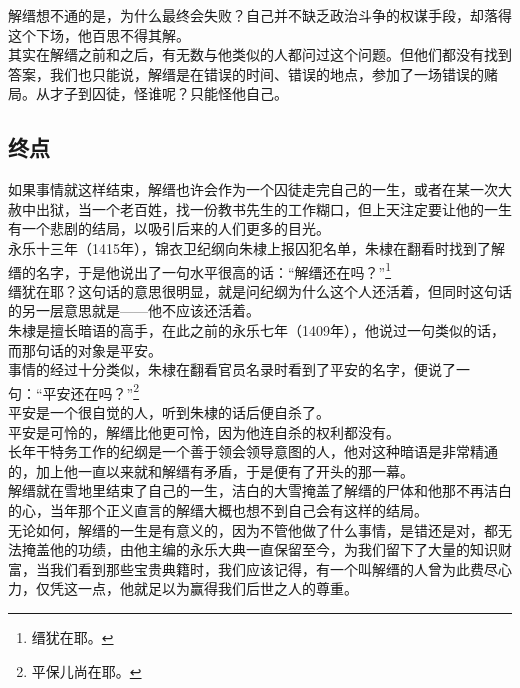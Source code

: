 \begin{multicols}{\theparacolNo}
解缙想不通的是，为什么最终会失败？自己并不缺乏政治斗争的权谋手段，却落得这个下场，他百思不得其解。\\

其实在解缙之前和之后，有无数与他类似的人都问过这个问题。但他们都没有找到答案，我们也只能说，解缙是在错误的时间、错误的地点，参加了一场错误的赌局。从才子到囚徒，怪谁呢？只能怪他自己。\\

\subsection{终点}
如果事情就这样结束，解缙也许会作为一个囚徒走完自己的一生，或者在某一次大赦中出狱，当一个老百姓，找一份教书先生的工作糊口，但上天注定要让他的一生有一个悲剧的结局，以吸引后来的人们更多的目光。\\

永乐十三年（1415年），锦衣卫纪纲向朱棣上报囚犯名单，朱棣在翻看时找到了解缙的名字，于是他说出了一句水平很高的话：“解缙还在吗？”\footnote{缙犹在耶。}\\

缙犹在耶？这句话的意思很明显，就是问纪纲为什么这个人还活着，但同时这句话的另一层意思就是——他不应该还活着。\\

朱棣是擅长暗语的高手，在此之前的永乐七年（1409年），他说过一句类似的话，而那句话的对象是平安。\\

事情的经过十分类似，朱棣在翻看官员名录时看到了平安的名字，便说了一句：“平安还在吗？”\footnote{平保儿尚在耶。}\\

平安是一个很自觉的人，听到朱棣的话后便自杀了。\\

平安是可怜的，解缙比他更可怜，因为他连自杀的权利都没有。\\

长年干特务工作的纪纲是一个善于领会领导意图的人，他对这种暗语是非常精通的，加上他一直以来就和解缙有矛盾，于是便有了开头的那一幕。\\

解缙就在雪地里结束了自己的一生，洁白的大雪掩盖了解缙的尸体和他那不再洁白的心，当年那个正义直言的解缙大概也想不到自己会有这样的结局。\\

无论如何，解缙的一生是有意义的，因为不管他做了什么事情，是错还是对，都无法掩盖他的功绩，由他主编的永乐大典一直保留至今，为我们留下了大量的知识财富，当我们看到那些宝贵典籍时，我们应该记得，有一个叫解缙的人曾为此费尽心力，仅凭这一点，他就足以为赢得我们后世之人的尊重。\\
\ifnum{}
	\end{multicols}
\fi
\newpage
